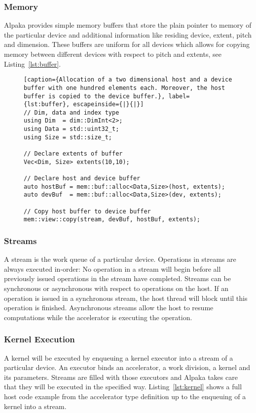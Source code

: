 \documentclass[10pt, twocolumn]{article}
\newcommand{\alpaka}{Alpaka\xspace}
\begin{document}
\subsubsection{Memory}
\alpaka provides simple memory buffers that store the plain pointer to memory of the particular device and additional information like residing device, extent, pitch and dimension.
These buffers are uniform for all devices which allows for copying memory between different devices with respect to pitch and extents, see Listing~\ref{lst:buffer}.

\begin{figure}
\begin{minipage}{\linewidth}
\hfill
  \begin{lstlisting}[caption={Allocation of a two dimensional host and a device buffer with one hundred elements each. Moreover, the host buffer is copied to the device buffer.}, label={lst:buffer}, escapeinside={|}{|}]
// Dim, data and index type
using Dim  = dim::DimInt<2>;
using Data = std::uint32_t;
using Size = std::size_t;

// Declare extents of buffer
Vec<Dim, Size> extents(10,10);

// Declare host and device buffer
auto hostBuf = mem::buf::alloc<Data,Size>(host, extents);
auto devBuf  = mem::buf::alloc<Data,Size>(dev, extents);

// Copy host buffer to device buffer
mem::view::copy(stream, devBuf, hostBuf, extents);
  \end{lstlisting}
\hfill
\end{minipage}
      \vspace{-1.5em}
\end{figure}
\subsubsection{Streams}
A stream is the work queue of a particular device.
Operations in streams are always executed in-order: No operation in a stream will begin before all previously issued operations in the stream have completed.
Streams can be synchronous or asynchronous with respect to operations on the host.
If an operation is issued in a synchronous stream, the host thread will block until this operation is finished.
Asynchronous streams allow the host to resume computations while the accelerator is executing the operation.
\subsubsection{Kernel Execution}
A kernel will be executed by enqueuing a kernel executor into a stream of a particular device.
An executor binds an accelerator, a work division, a kernel and its parameters.
Streams are filled with those executors and \alpaka takes care that they will be executed in the specified way.
Listing~\ref{lst:kernel} shows a full host code example from the accelerator type definition up to the enqueuing of a kernel into a stream.
\end{document}
